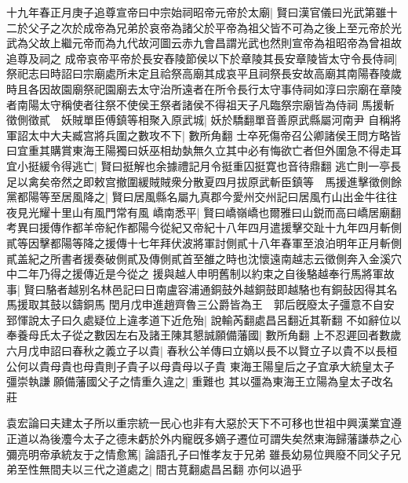 十九年春正月庚子追尊宣帝曰中宗始祠昭帝元帝於太廟|{
	賢曰漢官儀曰光武第雖十二於父子之次於成帝為兄弟於哀帝為諸父於平帝為祖父皆不可為之後上至元帝於光武為父故上繼元帝而為九代故河圖云赤九會昌謂光武也然則宣帝為祖昭帝為曾祖故追尊及祠之}
成帝哀帝平帝於長安舂陵節侯以下於章陵其長安章陵皆太守令長侍祠|{
	祭祀志曰時詔曰宗廟處所未定且祫祭高廟其成哀平且祠祭長安故高廟其南陽舂陵歲時且各因故園廟祭祀園廟去太守治所遠者在所令長行太守事侍祠如淳曰宗廟在章陵者南陽太守稱使者往祭不使侯王祭者諸侯不得祖天子凡臨祭宗廟皆為侍祠}
馬援斬徵側徵貳　妖賊單臣傅鎮等相聚入原武城|{
	妖於驕翻單音善原武縣屬河南尹}
自稱將軍詔太中大夫臧宫將兵圍之數攻不下|{
	數所角翻}
士卒死傷帝召公卿諸侯王問方略皆曰宜重其購賞東海王陽獨曰妖巫相劫埶無久立其中必有悔欲亡者但外圍急不得走耳宜小挺緩令得逃亡|{
	賢曰挺解也余據禮記月令挺重囚挺寛也音待鼎翻}
逃亡則一亭長足以禽矣帝然之即敕宫撤圍緩賊賊衆分散夏四月拔原武斬臣鎮等　馬援進擊徵側餘黨都陽等至居風降之|{
	賢曰居風縣名屬九真郡今愛州交州記曰居風冇山出金牛往往夜見光耀十里山有風門常有風}
嶠南悉平|{
	賢曰嶠嶺嶠也爾雅曰山鋭而高曰嶠居廟翻考異曰援傳作都羊帝紀作都陽今從紀又帝紀十八年四月遣援擊交趾十九年四月斬側貳等因擊都陽等降之援傳十七年拜伏波將軍討側貳十八年春軍至浪泊明年正月斬側貳盖紀之所書者援奏破側貳及傳側貳首至雒之時也沈懷遠南越志云徵側奔入金溪穴中二年乃得之援傳近是今從之}
援與越人申明舊制以約束之自後駱越奉行馬將軍故事|{
	賢曰駱者越别名林邑記曰日南盧容浦通銅鼓外越銅鼓即越駱也有銅鼔因得其名馬援取其鼓以鑄銅馬}
閏月戊申進趙齊魯三公爵皆為王　郭后旣廢太子彊意不自安郅惲說太子曰久處疑位上違孝道下近危殆|{
	說輸芮翻處昌呂翻近其靳翻}
不如辭位以奉養母氏太子從之數因左右及諸王陳其懇誠願備藩國|{
	數所角翻}
上不忍遲回者數歲六月戊申詔曰春秋之義立子以貴|{
	春秋公羊傳曰立嫡以長不以賢立子以貴不以長桓公何以貴母貴也母貴則子貴子以母貴母以子貴}
東海王陽皇后之子宜承大統皇太子彊崇執謙願備藩國父子之情重久違之|{
	重難也}
其以彊為東海王立陽為皇太子改名莊

袁宏論曰夫建太子所以重宗統一民心也非有大惡於天下不可移也世祖中興漢業宜遵正道以為後灋今太子之德未虧於外内寵旣多嫡子遷位可謂失矣然東海歸藩謙恭之心彌亮明帝承統友于之情愈篤|{
	論語孔子曰惟孝友于兄弟}
雖長幼易位興廢不同父子兄弟至性無間夫以三代之道處之|{
	間古莧翻處昌呂翻}
亦何以過乎

